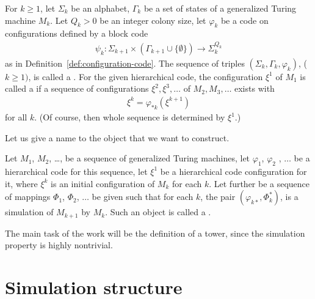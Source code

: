 \documentclass[12pt]{memoir}
\begin{document}
\begin{definition}\label{def:hierarchical-code}
For \( k\ge 1 \), let \( \Sigma_k \) be an alphabet, \( \Gamma_k \) be
a set of states of a generalized Turing machine \( M_k \).
Let \( Q_k>0 \) be an integer colony size, let \( \varphi_k \)
be a code on configurations defined by a block code
  \begin{align*}
       \psi_k: \Sigma_{k+1}\times(\Gamma_{k+1}\cup\{\emptyset\})
       \rightarrow \Sigma_k^{Q_k}
  \end{align*}
as in Definition~\ref{def:configuration-code}.
The sequence of triples \( (\Sigma_k,\Gamma_k,  \varphi_k) \), (\( k\ge 1) \),  is
called a .
For the given hierarchical code, the configuration \( \xi^{1} \) of \( M_{1} \)
is called a  if a sequence
of configurations \( \xi^{2},\xi^{3},\dots \) of \( M_{2},M_{3},\dots \) exists with
\begin{align*}
 \xi^{k}=\varphi_{*k}(\xi^{k+1})
 \end{align*} 
for all \( k \).
(Of course, then whole sequence is determined by \( \xi^{1} \).)
\end{definition}

Let us give a name to the object that we want to construct.

\begin{definition}[A tower]\label{def:tower}
Let \( M_1 \), \( M_2 \), \dots, be a sequence of generalized Turing machines,
let \( \varphi_{1} \), \( \varphi_{2} \) , \(\dots \) be a hierarchical code for this sequence,
let \( \xi^{1} \) be a hierarchical code configuration for it, where \( \xi^{k} \) is an
initial configuration of \( M_{k} \) for each \( k \).
Let further be a sequence of mappings \( \Phi_{1} \), \( \Phi_{2} \), \( \dots \) be
given such that for each \( k \), the pair \( (\varphi_{k*},\Phi_{k}^{*}) \),
is a simulation of \( M_{k+1} \) by \( M_{k} \).
Such an object is called a .
\end{definition}

The main task of the work will be the definition of a tower, since the simulation
property is highly nontrivial.





\section{Simulation structure}
\end{document}
